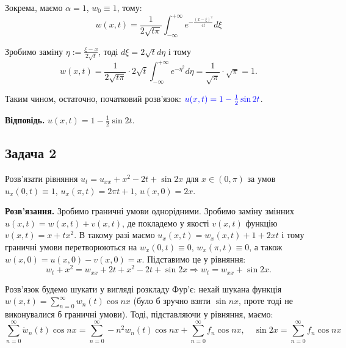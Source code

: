\documentclass{test_template}
\begin{document}
Зокрема, маємо $\alpha=1$, $w_0 \equiv 1$, тому:
\begin{equation*}
    w(x,t) = \frac{1}{2 \sqrt{t\pi}}\int_{-\infty}^{+\infty} e^{-\frac{(x-\xi)^2}{4t}}d\xi 
\end{equation*}

Зробимо заміну $\eta := \frac{\xi-x}{2\sqrt{t}}$, тоді $d\xi = 2\sqrt{t}d\eta$ і тому
\begin{equation*}
    w(x,t) = \frac{1}{2\sqrt{t\pi}} \cdot 2\sqrt{t} \int_{-\infty}^{+\infty} e^{-\eta^2}d\eta
    = \frac{1}{\sqrt{\pi}} \cdot \sqrt{\pi} = 1.
\end{equation*}

Таким чином, остаточно, початковий розв'язок: $\textcolor{blue}{u(x,t) = 1 -
\frac{1}{2}\sin 2t}$.

\textbf{Відповідь.} $u(x,t) = 1 - \frac{1}{2}\sin 2t$.

\newpage

\subsection{Задача 2}

\begin{problem}
    Розв'язати рівняння $u_t = u_{xx} + x^2 - 2t + \sin 2x$ для $x \in (0,\pi)$ за
    умов $u_x(0,t) \equiv 1$, $u_x(\pi,t) = 2\pi t+1$, $u(x,0)=2x$.
\end{problem}

\textbf{Розв'язання.} Зробимо граничні умови однорідними. Зробимо заміну змінних
$u(x,t) = w(x,t) + v(x,t)$, де покладемо у якості $v(x,t)$ функцію $v(x,t) =
x+tx^2$. В такому разі маємо $u_x(x,t) = w_x(x,t) + 1 + 2xt$ і тому граничні
умови перетворюються на $w_x(0,t) \equiv 0$, $w_x(\pi,t) \equiv 0$, а також
$w(x,0) = u(x,0)-v(x,0) = x$. Підставимо це у рівняння:
\begin{equation*}
    w_t + x^2 = w_{xx} + 2t + x^2 - 2t + \sin 2x \Rightarrow \boxed{w_t = w_{xx} + \sin 2x}.
\end{equation*}

Розв'язок будемо шукати у вигляді розкладу Фур'є: нехай шукана функція $w(x,t) =
\sum_{n=0}^{\infty}w_n(t) \cos nx$ (було б зручно взяти $\sin nx$, проте тоді не
виконувалися б граничні умови). Тоді, підставляючи у рівняння, маємо:
\begin{equation*}
    \sum_{n=0}^{\infty} \dot{w}_n(t) \cos nx = \sum_{n=0}^{\infty} -n^2 w_n(t) \cos nx + \sum_{n=0}^{\infty}f_n \cos nx, \quad \sin 2x = \sum_{n=0}^{\infty} f_n
\cos nx
\end{equation*}
\end{document}
